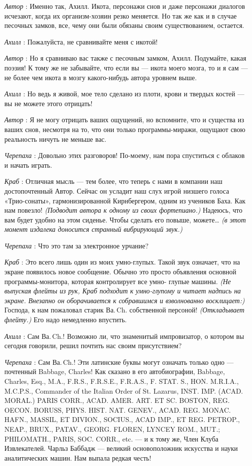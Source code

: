 \documentclass[../main.tex]{subfiles}
\begin{document}
\begin{dialogue}
\emph{Автор} : Именно так, Ахилл. Икота, персонажи снов и даже персонажи диалогов исчезают, когда их организм-хозяин резко меняется. Но так же как и в случае песочных замков, все, чему они были обязаны своим существованием, остается.

\emph{Ахилл} : Пожалуйста, не сравнивайте меня с икотой!

\emph{Автор} : Но я сравниваю вас также с песочным замком, Ахилл. Подумайте, какая поэзия! К тому же не забывайте, что если вы --- икота моего мозга, то и я сам --- не более чем икота в мозгу какого-нибудь автора уровнем выше.

\emph{Ахилл} : Но ведь я живой, мое тело сделано из плоти, крови и твердых костей --- вы не можете этого отрицать!

\emph{Автор} : Я не могу отрицать ваших ощущений, но вспомните, что и существа из ваших снов, несмотря на то, что они только программы-миражи, ощущают свою реальность ничуть не меньше вас.

\emph{Черепаха} : Довольно этих разговоров! По-моему, нам пора спуститься с облаков и начать играть.

\emph{Краб} : Отличная мысль --- тем более, что теперь с нами в компании наш достопочтенный Автор. Сейчас он усладит наш слух игрой низшего голоса «Трио-сонаты», гармонизированной Кирнбергером, одним из учеников Баха. Как нам повезло! \emph{(Подводит автора к одному из своих фортепиано.)} Надеюсь, что вам будет удобно на этом сиденье. Чтобы сделать его повыше, можете\ldots{} \emph{(в этот момент издалека доносится странный вибрирующий звук.)}

\emph{Черепаха} : Что это там за электронное урчание?

\emph{Краб} : Это всего лишь один из моих умно-глупых. Такой звук означает, что на экране появилось новое сообщение. Обычно это просто объявления основной программы-монитора, которая контролирует все умно- глупые машины. \emph{(Не выпуская флейты из рук, Краб подходит к умно-глупому и читает надпись на экране. Внезапно он оборачивается к собравшимся и взволнованно восклицает:)} Господа, к нам пожаловал старик Ва.\,Ch. собственной персоной! \emph{(Откладывает флейту.)} Его надо немедленно впустить.

\emph{Ахилл} : Сам Ва.\,Ch.! Возможно ли, что знаменитый импровизатор, о котором вы сегодня говорили, решил почтить нас своим присутствием?

\emph{Черепаха} : Сам Ва.\,Ch.! Эти латинские буквы могут означать только одно --- почтенный Babbage, Charles! Как сказано в его автобиографии, Babbage, Charles, Esq., M.A., F.R.S., F.R.S.E., F.R.A.S., F. STAT. S., HON. M.R.I.A., M.C.P.S., Commander of the Italian Order of St. Lazarus, INST. IMP. (ACAD. MORAL.) PARIS CORR., ACAD. AMER. ART. ET SC. BOSTON, REG. OECON. BORUSS, PHYS. HIST. NAT. GENEV., ACAD. REG. MONAC. HAFN., MASSIL, ET DIVION., SOCIUS., ACAD IMP., ET REG. PETROP., NEAP., BRUX., PATAV., GEORG. FLOREN, LYNCEY ROM., MUT.; PHILOMATH., PARIS, SOC. CORR., etc. --- и к тому же, Член Клуба Извлекателей. Чарльз Баббадж --- великий основоположник искусства и науки аналитических машин. Нам выпала редкая честь!


\end{dialogue}
\end{document}
